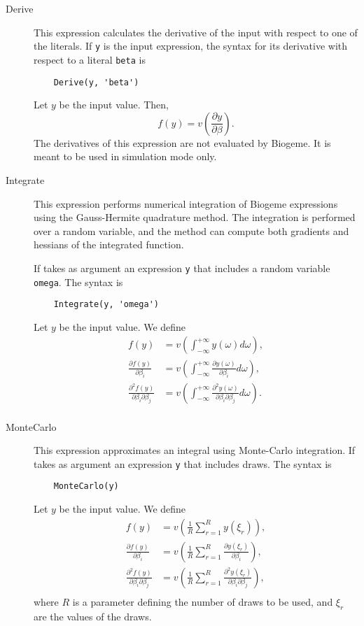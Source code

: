 \documentclass[12pt,a4paper]{article}
\begin{document}
\begin{description}
\item[Derive] This expression calculates the derivative of the input
  with respect to one of the literals. If \lstinline+y+ is the
  input expression, the syntax for its derivative with respect to a
  literal \lstinline+beta+ is
  \begin{lstlisting}
    Derive(y, 'beta')
  \end{lstlisting}
  Let $y$ be the input value. Then,
  \[
  f(y) = v\left(\frac{\partial y}{\partial \beta}\right).
  \]
  The derivatives of this expression are not evaluated by Biogeme. It is meant to be used in simulation mode only.

\item[Integrate] This expression performs numerical integration
of Biogeme expressions using the Gauss-Hermite quadrature method. The integration is performed over a random variable, and the method can compute both gradients and hessians of the integrated function.

If takes as argument an expression
  \lstinline+y+ that includes a random variable
  \lstinline+omega+. The syntax is
  \begin{lstlisting}
    Integrate(y, 'omega')
  \end{lstlisting}
  Let $y$ be the input value. We define
  \begin{align*}
    f(y) &= v\left(\int_{-\infty}^{+\infty} y(\omega) d\omega\right), \\
    \frac{\partial f(y)}{\partial \beta_i} &= v\left(\int_{-\infty}^{+\infty} \frac{\partial y(\omega)}{\partial \beta_i} d\omega\right),\\
    \frac{\partial^2 f(y)}{\partial \beta_i\partial \beta_j} &= v\left( \int_{-\infty}^{+\infty} \frac{\partial^2 y(\omega)}{\partial \beta_i \partial \beta_j} d\omega\right).\\
  \end{align*}

  
\item[MonteCarlo] This expression approximates an integral using Monte-Carlo integration.
If takes as argument an expression
  \lstinline+y+ that includes draws.
The syntax is
  \begin{lstlisting}
    MonteCarlo(y)
  \end{lstlisting}
  Let $y$ be the input value. We define
  \begin{align*}
    f(y) &= v\left(\frac{1}{R}\sum_{r=1}^R y(\xi_r)\right), \\
    \frac{\partial f(y)}{\partial \beta_i} &= v\left(\frac{1}{R}\sum_{r=1}^R \frac{\partial y(\xi_r)}{\partial \beta_i}\right), \\
    \frac{\partial^2 f(y)}{\partial \beta_i\partial \beta_j} &= v\left(\frac{1}{R}\sum_{r=1}^R \frac{\partial^2 y(\xi_r)}{\partial \beta_i \partial \beta_j}\right), \\
  \end{align*}
  where $R$ is a parameter defining the number of draws to be used, and $\xi_r$ are the values of the draws.
  

\end{description}
\end{document}
